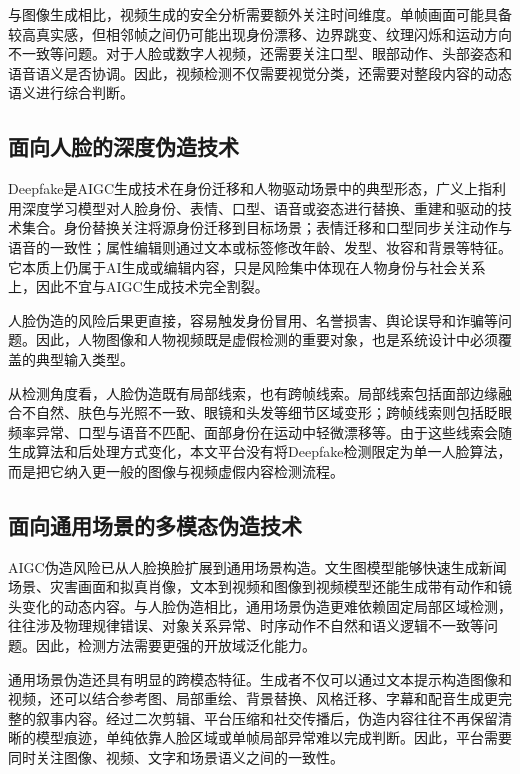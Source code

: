 与图像生成相比，视频生成的安全分析需要额外关注时间维度。单帧画面可能具备较高真实感，但相邻帧之间仍可能出现身份漂移、边界跳变、纹理闪烁和运动方向不一致等问题。对于人脸或数字人视频，还需要关注口型、眼部动作、头部姿态和语音语义是否协调。因此，视频检测不仅需要视觉分类，还需要对整段内容的动态语义进行综合判断。

\subsection{面向人脸的深度伪造技术}

Deepfake是AIGC生成技术在身份迁移和人物驱动场景中的典型形态，广义上指利用深度学习模型对人脸身份、表情、口型、语音或姿态进行替换、重建和驱动的技术集合\cite{ref13,ref14,ref21,ref22}。身份替换关注将源身份迁移到目标场景；表情迁移和口型同步关注动作与语音的一致性；属性编辑则通过文本或标签修改年龄、发型、妆容和背景等特征。它本质上仍属于AI生成或编辑内容，只是风险集中体现在人物身份与社会关系上，因此不宜与AIGC生成技术完全割裂。

人脸伪造的风险后果更直接，容易触发身份冒用、名誉损害、舆论误导和诈骗等问题。因此，人物图像和人物视频既是虚假检测的重要对象，也是系统设计中必须覆盖的典型输入类型。

从检测角度看，人脸伪造既有局部线索，也有跨帧线索。局部线索包括面部边缘融合不自然、肤色与光照不一致、眼镜和头发等细节区域变形；跨帧线索则包括眨眼频率异常、口型与语音不匹配、面部身份在运动中轻微漂移等。由于这些线索会随生成算法和后处理方式变化，本文平台没有将Deepfake检测限定为单一人脸算法，而是把它纳入更一般的图像与视频虚假内容检测流程。

\subsection{面向通用场景的多模态伪造技术}

AIGC伪造风险已从人脸换脸扩展到通用场景构造。文生图模型能够快速生成新闻场景、灾害画面和拟真肖像，文本到视频和图像到视频模型还能生成带有动作和镜头变化的动态内容。与人脸伪造相比，通用场景伪造更难依赖固定局部区域检测，往往涉及物理规律错误、对象关系异常、时序动作不自然和语义逻辑不一致等问题。因此，检测方法需要更强的开放域泛化能力。

通用场景伪造还具有明显的跨模态特征。生成者不仅可以通过文本提示构造图像和视频，还可以结合参考图、局部重绘、背景替换、风格迁移、字幕和配音生成更完整的叙事内容。经过二次剪辑、平台压缩和社交传播后，伪造内容往往不再保留清晰的模型痕迹，单纯依靠人脸区域或单帧局部异常难以完成判断。因此，平台需要同时关注图像、视频、文字和场景语义之间的一致性。

